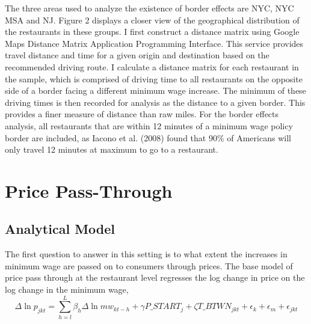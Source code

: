 \documentclass[11pt]{article}
\begin{document}
The three areas used to analyze the existence of border effects are NYC, NYC MSA and NJ. Figure 2 displays a closer view of the geographical distribution of the restaurants in these groups. I first construct a distance matrix using Google Maps Distance Matrix Application Programming Interface. This service provides travel distance and time for a given origin and destination based on the recommended driving route. I calculate a distance matrix for each restaurant in the sample, which is comprised of driving time to all restaurants on the opposite side of a border facing a different minimum wage increase. The minimum of these driving times is then recorded for analysis as the distance to a given border. This provides a finer measure of distance than raw miles.  For the border effects analysis, all restaurants that are within 12 minutes of a minimum wage policy border are included, as Iacono et al. (2008) found that 90\% of Americans will only travel 12 minutes at maximum to go to a restaurant\nocite{drivingtime}.




\section{Price Pass-Through}

\subsection{Analytical Model}

The first question to answer in this setting is to what extent the increases in minimum wage are passed on to consumers through prices. The base model of price pass through at the restaurant level regresses the log change in price on the log change in the minimum wage,
\begin{dmath}
\Delta \ln p_{jkt} = \sum_{h=l}^{L}\beta_h \Delta \ln mw_{kt-h} + \gamma  P\_START_{j} + \zeta T\_BTWN_{jkt}   + \epsilon_k + \epsilon_m +\epsilon_{jkt}
\end{dmath}
\end{document}

